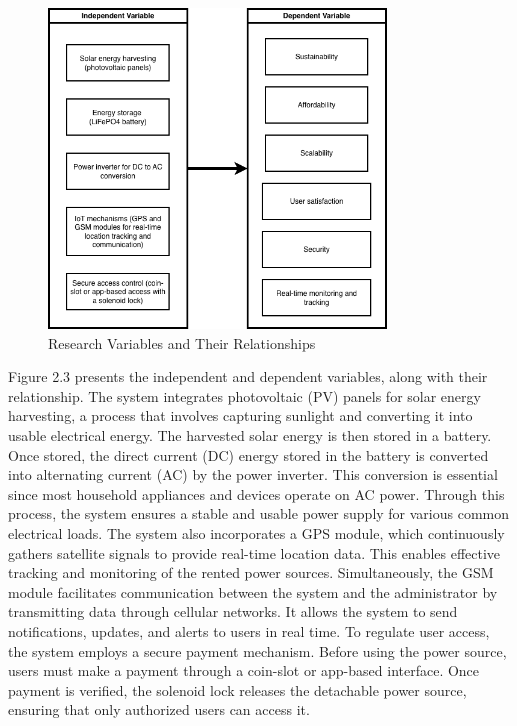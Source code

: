 {\begin{figure}[H]
	\centering
	\caption{Research Variables and Their Relationships}
	\label{fig:schematic}
	\includegraphics[width=0.8\textwidth]{figures/schematic.png}
\end{figure}

Figure 2.3 presents the independent and dependent variables, along with their relationship. The system integrates photovoltaic (PV) panels for solar energy harvesting, a process that involves capturing sunlight and converting it into usable electrical energy. The harvested solar energy is then stored in a  battery. Once stored, the direct current (DC) energy stored in the  battery is converted into alternating current (AC) by the power inverter. This conversion is essential since most household appliances and devices operate on AC power. Through this process, the system ensures a stable and usable power supply for various common electrical loads. The system also incorporates a GPS module, which continuously gathers satellite signals to provide real-time location data. This enables effective tracking and monitoring of the rented power sources. Simultaneously, the GSM module facilitates communication between the system and the administrator by transmitting data through cellular networks. It allows the system to send notifications, updates, and alerts to users in real time. To regulate user access, the system employs a secure payment mechanism. Before using the power source, users must make a payment through a coin-slot or app-based interface. Once payment is verified, the solenoid lock releases the detachable power source, ensuring that only authorized users can access it.

}
